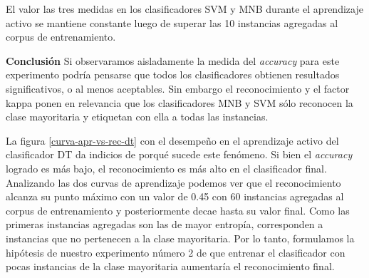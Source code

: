El valor las tres medidas en los clasificadores SVM y MNB durante el aprendizaje activo se mantiene constante luego de superar las 10 instancias agregadas al corpus de entrenamiento.

\vspace{3 mm}

\textbf{Conclusión}
Si observaramos aisladamente la medida del \textit{accuracy} para este experimento podría pensarse que todos los clasificadores obtienen resultados significativos, o al menos aceptables. Sin embargo el reconocimiento y el factor kappa ponen en relevancia que los clasificadores MNB y SVM sólo reconocen la clase mayoritaria y etiquetan con ella a todas las instancias.

La figura \ref{curva-apr-vs-rec-dt} con el desempeño en el aprendizaje activo del clasificador DT da indicios de porqué sucede este fenómeno. Si bien el \textit{accuracy} logrado es más bajo, el reconocimiento es más alto en el clasificador final. Analizando las dos curvas de aprendizaje podemos ver que el reconocimiento alcanza su punto máximo con un valor de 0.45 con 60 instancias agregadas al corpus de entrenamiento y posteriormente decae hasta su valor final. Como las primeras instancias agregadas son las de mayor entropía, corresponden a instancias que no pertenecen a la clase mayoritaria. Por lo tanto, formulamos la hipótesis de nuestro experimento número 2 de que entrenar el clasificador con pocas instancias de la clase mayoritaria aumentaría el reconocimiento final.

